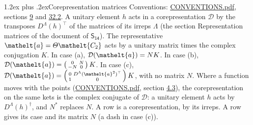 \documentclass[10pt,a4paper]{article}
\makeatletter
\renewcommand\section{\@startsection{section}{1}{\z@}{-3ex plus -1ex minus -.2ex}%
  {1.2ex plus .2ex}{\normalfont\large\sffamily\bfseries\color{parttitle}}}
\numberwithin{equation}{section}
\newcommand{\eltfont}[1]{{\let\sigma\eltsigma\mathelt{#1}}}
\newcommand{\grp}[1]{\mathsf{#1}}
\newcommand{\elt}[1]{\eltfont{#1}}
\makeatother
\begin{document}
\section{Corepresentation matrices}\label{s:corep_matrices}
Conventions: \href{../../CONVENTIONS.pdf}{CONVENTIONS.pdf}, sections \href{../../../rotation/CONVENTIONS.pdf\#conv.9}{9} and \href{../../CONVENTIONS.pdf\#conv.32.2}{32.2}.
A unitary element $h$ acts in a corepresentation $\mathcal{D}$ by the transposes $D^{\Lambda}(h)^{\top}$ of the matrices of its irreps $\Lambda$ (the section Representation matrices of the document of \href{../../../rotation/data/pdf/S14.pdf}{$\grp{S_{14}}$}). The representative $\elt{a} = \varTheta\elt{C_{2}}$ acts by a unitary matrix times the complex conjugation $K$.
In case (a), $\mathcal{D}(\elt{a}) = NK$. In case (b), $\mathcal{D}(\elt{a}) = \left(\begin{smallmatrix} 0 & N \\ -N & 0 \end{smallmatrix}\right) K$. In case (c), $\mathcal{D}(\elt{a}) = \left(\begin{smallmatrix} 0 & D^{\Lambda}(\elt{a}^2)^{\top} \\ 1 & 0 \end{smallmatrix}\right) K$, with no matrix $N$.
Where a function moves with the points (\href{../../CONVENTIONS.pdf}{CONVENTIONS.pdf}, section \href{../../../rotation/CONVENTIONS.pdf\#conv.4.3}{4.3}), the corepresentation on the same kets is the complex conjugate of $\mathcal{D}$: a unitary element $h$ acts by $D^{\Lambda}(h)^{\dagger}$, and $N^{*}$ replaces $N$.
A row is a corepresentation, by its irreps. A row gives its case and its matrix $N$ (a dash in case (c)).
\end{document}
